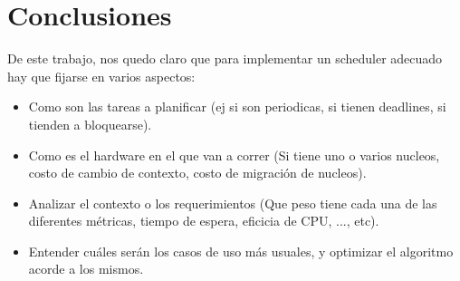 \section{Conclusiones}

De este trabajo, nos quedo claro que para implementar un scheduler adecuado hay que fijarse en varios aspectos: \\

\begin{itemize}
	\item Como son las tareas a planificar (ej si son periodicas, si tienen deadlines, si tienden a bloquearse).
	\item Como es el hardware en el que van a correr (Si tiene uno o varios nucleos, costo de cambio de contexto, costo de migración de nucleos).
	\item Analizar el contexto o los requerimientos (Que peso tiene cada una de las diferentes métricas, tiempo de espera, eficicia de CPU, ..., etc).
	\item Entender cu\'ales ser\'an los casos de uso m\'as usuales, y optimizar el algoritmo acorde a los mismos.
\end{itemize}